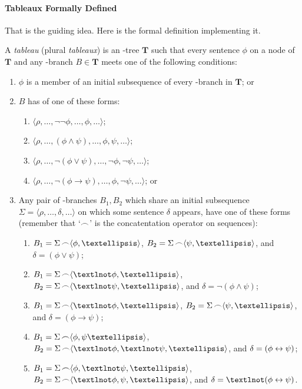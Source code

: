 \paragraph{Tableaux Formally Defined} That is the guiding idea. Here is the formal definition implementing it.
\begin{definition}[Tableaux]\label{def:tableau}
	A \emph{tableau} (plural \emph{tableaux}) is an \lone-tree $\mathbf{T}$ such that every sentence $\phi$ on a node of $\mathbf{T}$ and any \lone-branch $B \in \mathbf{T}$ meets one of the following conditions: \begin{enumerate}
		\item $\phi$ is a member of an initial subsequence of every \lone-branch in $\mathbf{T}$; or
		\item $B$ has of one of these forms: \begin{enumerate}
			\item $\langle \rho,…, ¬¬\phi, …, \phi,…\rangle$;
			\item $\langle \rho,…, (\phi\wedge \psi), …, \phi,\psi,…\rangle$;
			\item $\langle \rho, …, ¬(\phi\vee \psi), …, ¬\phi,¬\psi,…\rangle$;
			\item $\langle \rho, …, ¬(\phi\to \psi), …, \phi,¬\psi,…\rangle$; or
		\end{enumerate} 
		\item Any pair of \lone-branches $B_{1},B_{2}$ which share an initial subsequence $\Sigma = \langle \rho, …, \delta, …\rangle$ on which some sentence $\delta$ appears, have one of these forms (remember that `$\mathop{\frown}$' is the concatentation operator on sequences): \begin{enumerate}
			\item $B_{1} =  \Sigma \conc \langle\phi,…\rangle$, $B_{2} = \Sigma \conc \langle\psi,…\rangle$, and $\delta=(\phi\vee\psi)$;
			\item $B_{1} =  \Sigma \conc \langle ¬\phi,…\rangle$, $B_{2} = \Sigma \conc \langle ¬\psi,…\rangle$, and $\delta=¬(\phi\wedge\psi)$;
			\item $B_{1} =  \Sigma \conc \langle ¬\phi,…\rangle$, $B_{2} = \Sigma \conc \langle\psi,…\rangle$, and $\delta=(\phi\to\psi)$;
			\item $B_{1} =  \Sigma \conc \langle\phi,\psi…\rangle$, $B_{2} = \Sigma \conc \langle ¬\phi,¬\psi,…\rangle$, and $\delta=(\phi\leftrightarrow\psi)$;
			\item $B_{1} =  \Sigma \conc \langle\phi,¬\psi,…\rangle$, $B_{2} = \Sigma \conc \langle ¬\phi,\psi,…\rangle$, and $\delta=¬(\phi\bicond\psi)$.
		\end{enumerate}
	\end{enumerate}
\end{definition}


